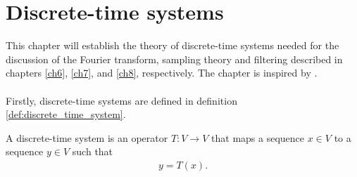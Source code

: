 \chapter{Discrete-time systems}\label{discrete_time_systems} \label{ch4}
This chapter will establish the theory of discrete-time systems needed for the discussion of the Fourier transform, sampling theory and filtering described in chapters \ref{ch6}, \ref{ch7}, and \ref{ch8}, respectively. The chapter is inspired by \cite{page 195-198, FSP}.
\\ \\
Firstly, discrete-time systems are defined in definition \ref{def:discrete_time_system}.

\begin{definition}\label{def:discrete_time_system}
A discrete-time system is an operator $T: V \to V$ that maps a sequence $x\in V$ to a sequence $y\in V$ such that
\begin{align}
y=T(x).
\end{align}
\end{definition}

